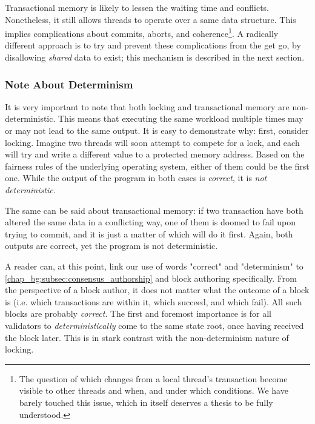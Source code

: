 Transactional memory is likely to lessen the waiting time and conflicts. Nonetheless, it still
allows threads to operate over a same data structure. This implies complications about commits,
aborts, and coherence\footnote{The question of which changes from a local thread's transaction
become visible to other threads and when, and under which conditions. We have barely touched this
issue, which in itself deserves a thesis to be fully understood.}. A radically different approach is
to try and prevent these complications from the get go, by disallowing \textit{shared} data to
exist; this mechanism is described in the next section.

\subsubsection*{Note About Determinism}


It is very important to note that both locking and transactional memory are non-deterministic. This
means that executing the same workload multiple times may or may not lead to the same output. It is
easy to demonstrate why: first, consider locking. Imagine two threads will soon attempt to compete
for a lock, and each will try and write a different value to a protected memory address. Based on
the fairness rules of the underlying operating system, either of them could be the first one. While
the output of the program in both cases is \textit{correct}, it is \textit{not deterministic}.

The same can be said about transactional memory: if two transaction have both altered the same data
in a conflicting way, one of them is doomed to fail upon trying to commit, and it is just a matter
of which will do it first. Again, both outputs are correct, yet the program is not deterministic.

\begin{remark}
	A reader can, at this point, link our use of words "correct" and "determinism" to
	\ref{chap_bg:subsec:consensus_authorship} and block authoring specifically. From the perspective
	of a block author, it does not matter what the outcome of a block is (i.e. which transactions
	are within it, which succeed, and which fail). All such blocks are probably \textit{correct}.
	The first and foremost importance is for all validators to \textit{deterministically} come to
	the same state root, once having received the block later. This is in stark contrast with the
	non-determinism nature of locking.
\end{remark}


